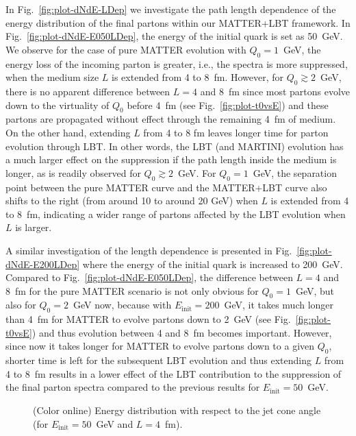 \documentclass[aps,prc,twocolumn,floatfix,superscriptaddress,nofootinbib]{revtex4}
\begin{document}
In Fig.~\ref{fig:plot-dNdE-LDep} we investigate the path length dependence of the energy distribution of the final partons within our MATTER+LBT framework. In Fig.~\ref{fig:plot-dNdE-E050LDep}, the energy of the initial quark is set as 50~GeV. We observe for the case of pure MATTER evolution with $Q_0=1$~GeV, the energy loss of the incoming parton is greater, i.e., the spectra is more suppressed, when the medium size $L$ is extended from 4 to 8~fm. However, for $Q_0\gtrsim2$~GeV, there is no apparent difference between $L=4$ and 8~fm since most partons evolve down to the virtuality of $Q_0$ before 4~fm (see Fig.~\ref{fig:plot-t0vsE}) and these partons are propagated without effect through the remaining  4~fm of medium. On the other hand, extending $L$ from 4 to 8 fm leaves longer time for parton evolution through LBT. In other words, the LBT (and MARTINI) evolution has a much larger effect on the suppression if the path length inside the medium is longer, as is readily observed for $Q_0\gtrsim2$~GeV. For $Q_0=1$~GeV, the separation point between the pure MATTER curve and the MATTER+LBT curve also shifts to the right (from around 10 to around 20 GeV) when $L$ is extended from 4 to 8~fm, indicating a wider range of partons affected by the LBT evolution when $L$ is larger.

A similar investigation of the length dependence is presented in Fig.~\ref{fig:plot-dNdE-E200LDep} where the energy of the initial quark is increased to 200~GeV. Compared to Fig.~\ref{fig:plot-dNdE-E050LDep}, the difference between $L=4$ and 8~fm for the pure MATTER scenario is not only obvious for $Q_0=1$~GeV, but also for $Q_0=2$~GeV now, because with $E_\mathrm{init}=200$~GeV, it takes much longer than 4~fm for MATTER to evolve partons down to 2~GeV (see Fig.~\ref{fig:plot-t0vsE}) and thus evolution between 4 and 8~fm becomes important. However, since now it takes longer for MATTER to evolve partons down to a given $Q_0$, shorter time is left for the subsequent LBT evolution and thus extending $L$ from 4 to 8~fm results in a lower effect of the LBT contribution to the suppression of the final parton spectra compared to the previous results for $E_\mathrm{init}=50$~GeV.


\begin{figure}[tb]
  \caption{(Color online) Energy distribution with respect to the jet cone angle (for $E_\mathrm{init}=50$~GeV and $L=4$~fm).}
 \label{fig:plot-dEdth-E050L04}
\end{figure}
\end{document}
